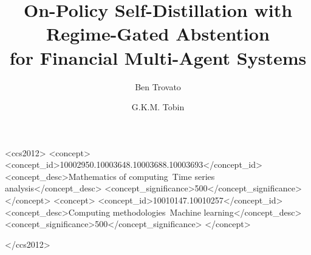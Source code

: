 \documentclass[sigconf,anonymous,review]{acmart}
\title{On-Policy Self-Distillation with Regime-Gated Abstention\\for Financial Multi-Agent Systems}
\author{Ben Trovato}
\author{G.K.M. Tobin}
\affiliation{%
  \institution{Institute for Clarity in Documentation}
  \city{Dublin}
  \state{Ohio}
  \country{USA}
}
\begin{document}


\begin{CCSXML}
<ccs2012>
  <concept>
    <concept_id>10002950.10003648.10003688.10003693</concept_id>
    <concept_desc>Mathematics of computing~Time series analysis</concept_desc>
    <concept_significance>500</concept_significance>
  </concept>
  <concept>
    <concept_id>10010147.10010257</concept_id>
    <concept_desc>Computing methodologies~Machine learning</concept_desc>
    <concept_significance>500</concept_significance>
  </concept>

</ccs2012>
\end{CCSXML}



\maketitle  











\newpage
\appendix

\end{document}
